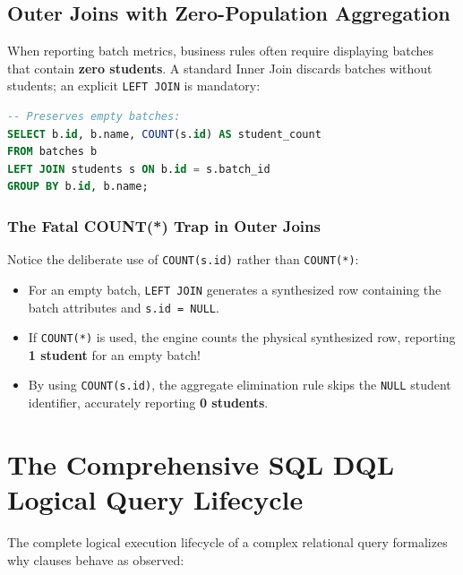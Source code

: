 \documentclass[10pt,twocolumn,letterpaper]{article}
\begin{document}
\subsection{Outer Joins with Zero-Population Aggregation}
When reporting batch metrics, business rules often require displaying batches that contain \textbf{zero students}. A standard Inner Join discards batches without students; an explicit \texttt{LEFT JOIN} is mandatory:
\begin{lstlisting}[language=SQL]
-- Preserves empty batches:
SELECT b.id, b.name, COUNT(s.id) AS student_count
FROM batches b
LEFT JOIN students s ON b.id = s.batch_id
GROUP BY b.id, b.name;
\end{lstlisting}

\subsubsection{The Fatal COUNT(*) Trap in Outer Joins}
Notice the deliberate use of \texttt{COUNT(s.id)} rather than \texttt{COUNT(*)}:
\begin{itemize}
    \item For an empty batch, \texttt{LEFT JOIN} generates a synthesized row containing the batch attributes and \texttt{s.id = NULL}.
    \item If \texttt{COUNT(*)} is used, the engine counts the physical synthesized row, reporting \textbf{1 student} for an empty batch!
    \item By using \texttt{COUNT(s.id)}, the aggregate elimination rule skips the \texttt{NULL} student identifier, accurately reporting \textbf{0 students}.
\end{itemize}

\section{The Comprehensive SQL DQL Logical Query Lifecycle}
\label{sec:execution_order}

The complete logical execution lifecycle of a complex relational query formalizes why clauses behave as observed:
\end{document}

